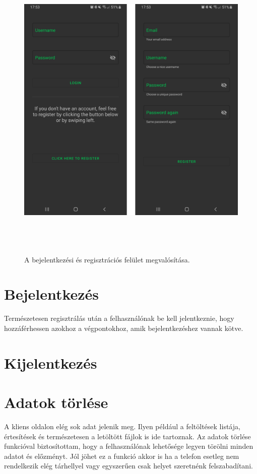 \documentclass{thesis-ekf}
\theoremstyle{definition}
\theoremstyle{remark}
\begin{document}
\begin{figure}[!h]
	\centering
	\includegraphics[height=15cm]{pictures/android_login_registration}
	\caption{A bejelentkezési és regisztrációs felület megvalósítása.}
	\label{registration}
\end{figure}

\section{Bejelentkezés}

Természetesen regisztrálás után a felhasználónak be kell jelentkeznie, hogy hozzáférhessen azokhoz a végpontokhoz, amik bejelentkezéshez vannak kötve.

\section{Kijelentkezés}

\section{Adatok törlése}

A kliens oldalon elég sok adat jelenik meg. 
Ilyen például a feltöltések listája, értesítések és természetesen a letöltött fájlok is ide tartoznak.
Az adatok törlése funkcióval biztosítottam, hogy a felhasználónak lehetősége legyen törölni minden adatot és előzményt.
Jól jöhet ez a funkció akkor is ha a telefon esetleg nem rendelkezik elég tárhellyel vagy egyszerűen csak helyet szeretnénk felszabadítani.
\end{document}
